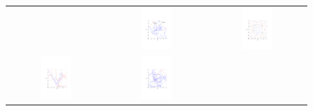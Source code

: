 \documentclass{article} %
\begin{document}
\begin{figure}[t!]
\begin{center}
\begin{tabular}{ccc}
&\includegraphics[trim={3.2cm 6cm 3cm 9cm},clip,width=0.33\textwidth]{../plots3/ReflectiveHMC_l25_eps0_1_log_scatter2D_annotated.pdf}
&\includegraphics[trim={3.2cm 6cm 3.2cm 9cm},clip,width=0.33\textwidth]{../plots3/energy_contour.pdf}  \\
  \includegraphics[trim={3.2cm 6cm 3.2cm 9cm},clip,width=0.33\textwidth]{../plots3/BaselineHMC_l25_eps0_2_log_scatter2D.pdf} 
&\includegraphics[trim={3.2cm 6cm 3.2cm 9cm},clip,width=0.33\textwidth]{../plots3/ReflectiveHMC_l25_eps0_2_log_scatter2D.pdf} 

\end{tabular}
\end{center}
\end{figure}
\end{document}
